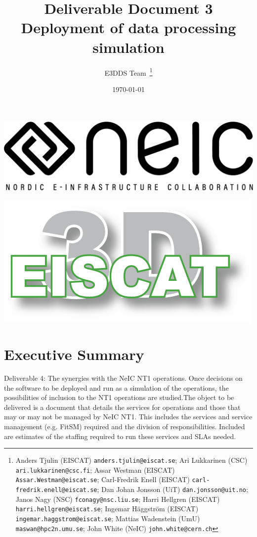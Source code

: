 \documentclass[12pt,a4paper]{article}
\title{
{\bf Deliverable Document 3} \\
Deployment of \ED data processing simulation}
\author{E3DDS Team~\footnote{
Anders Tjulin (EISCAT) {\tt anders.tjulin@eiscat.se};
Ari Lukkarinen (CSC) {\tt ari.lukkarinen@csc.fi};
Assar Westman (EISCAT) {\tt Assar.Westman@eiscat.se};
Carl-Fredrik Enell (EISCAT) {\tt carl-fredrik.enell@eiscat.se};
Dan Johan Jonsson (UiT) {\tt dan.jonsson@uit.no};
Janos Nagy (NSC) {\tt fconagy@nsc.liu.se};
Harri Hellgren (EISCAT) {\tt harri.hellgren@eiscat.se};
Ingemar H\"{a}ggstr\"{o}m (EISCAT) {\tt ingemar.haggstrom@eiscat.se};
Mattias Wadenstein (UmU) {\tt maswan@hpc2n.umu.se};
John White (NeIC) {\tt john.white@cern.ch}}}
\date{\today}
\begin{document}
\pagestyle{fancy}

\maketitle
\par\noindent
\begin{minipage}{0.5\textwidth}
  \includegraphics[scale=0.18]{NEIC_logo_screen_black.pdf}
\end{minipage}
\begin{minipage}{0.5\textwidth}
  \hfill
  \includegraphics[width=0.75\linewidth]{e3d-logo-green-500px}
\end{minipage}

\newpage
\tableofcontents
\newpage

\section{Executive Summary}
\label{exec-summ}


Deliverable 4: The synergies with the NeIC NT1 operations. Once decisions on the software to be deployed and run as a simulation of the \ED operations, the possibilities of inclusion to the NT1 operations are studied.The object to be delivered is a document that details the services for \ED operations and those that may or may not be managed by NeIC NT1. This includes the services and service management (e.g. FitSM) required and the division of responsibilities.  Included are estimates of the staffing required to run these services and SLAs needed. 
\end{document}
